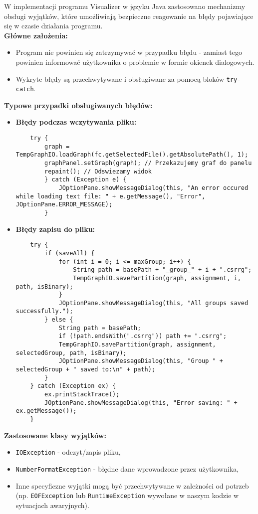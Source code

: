 \documentclass[a4paper,12pt]{article}
\begin{document}
W implementacji programu Visualizer w języku Java zastosowano mechanizmy obsługi wyjątków, które umożliwiają bezpieczne reagowanie na błędy pojawiające się w czasie działania programu. \\
\textbf{Główne założenia:}
\begin{itemize}
    \item Program nie powinien się zatrzymywać w przypadku błędu - zamiast tego powinien informować użytkownika o problemie w formie okienek dialogowych.
    \item Wykryte błędy są przechwytywane i obsługiwane za pomocą bloków \texttt{try-catch}.
\end{itemize}
\textbf{Typowe przypadki obsługiwanych błędów:}
\begin{itemize}
    \item \textbf{Błędy podczas wczytywania pliku:}
    \begin{lstlisting}
    try {
        graph = TempGraphIO.loadGraph(fc.getSelectedFile().getAbsolutePath(), 1);
        graphPanel.setGraph(graph); // Przekazujemy graf do panelu
        repaint(); // Odswiezamy widok
        } catch (Exception e) {
            JOptionPane.showMessageDialog(this, "An error occured while loading text file: " + e.getMessage(), "Error", JOptionPane.ERROR_MESSAGE);
        }
    \end{lstlisting}
    \item \textbf{Błędy zapisu do pliku:}
    \begin{lstlisting}
    try {
        if (saveAll) {
            for (int i = 0; i <= maxGroup; i++) {
                String path = basePath + "_group_" + i + ".csrrg";
                TempGraphIO.savePartition(graph, assignment, i, path, isBinary);
            }
            JOptionPane.showMessageDialog(this, "All groups saved successfully.");
        } else {
            String path = basePath;
            if (!path.endsWith(".csrrg")) path += ".csrrg";
            TempGraphIO.savePartition(graph, assignment, selectedGroup, path, isBinary);
            JOptionPane.showMessageDialog(this, "Group " + selectedGroup + " saved to:\n" + path);
        }
    } catch (Exception ex) {
        ex.printStackTrace();
        JOptionPane.showMessageDialog(this, "Error saving: " + ex.getMessage());
    }
    \end{lstlisting}
\end{itemize}
\textbf{Zastosowane klasy wyjątków:}
\begin{itemize}
    \item \texttt{IOException} - odczyt/zapis pliku,
    \item \texttt{NumberFormatException} - błędne dane wprowadzone przez użytkownika,
    \item Inne specyficzne wyjątki mogą być przechwytywane w zależności od potrzeb (np. \texttt{EOFException} lub \texttt{RuntimeException} wywołane w naszym kodzie w sytuacjach awaryjnych).
\end{itemize}
\end{document}
